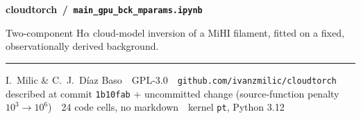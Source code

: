 \documentclass[9pt,a4paper]{article}
\begin{document}
\small

{\sffamily\bfseries\large\color{acc} cloudtorch \,/\, \texttt{main\_gpu\_bck\_mparams.ipynb}}

\vspace{1pt}
{\sffamily\color{gry}\footnotesize Two-component H$\alpha$ cloud-model inversion of a MiHI filament, fitted on a fixed, observationally derived background.}

\vspace{1.5pt}
{\footnotesize\color{gry}\rule{\textwidth}{0.4pt}}
\vspace{-2pt}

{\footnotesize\color{gry}I.~Milic \& C.~J.~D\'iaz Baso \,\textbullet\, GPL-3.0 \,\textbullet\, \texttt{github.com/ivanzmilic/cloudtorch} \,\textbullet\, described at commit \texttt{1b10fab} + uncommitted change (source-function penalty $10^3\!\rightarrow\!10^6$) \,\textbullet\, 24 code cells, no markdown \,\textbullet\, kernel \texttt{pt}, Python 3.12}
\end{document}
